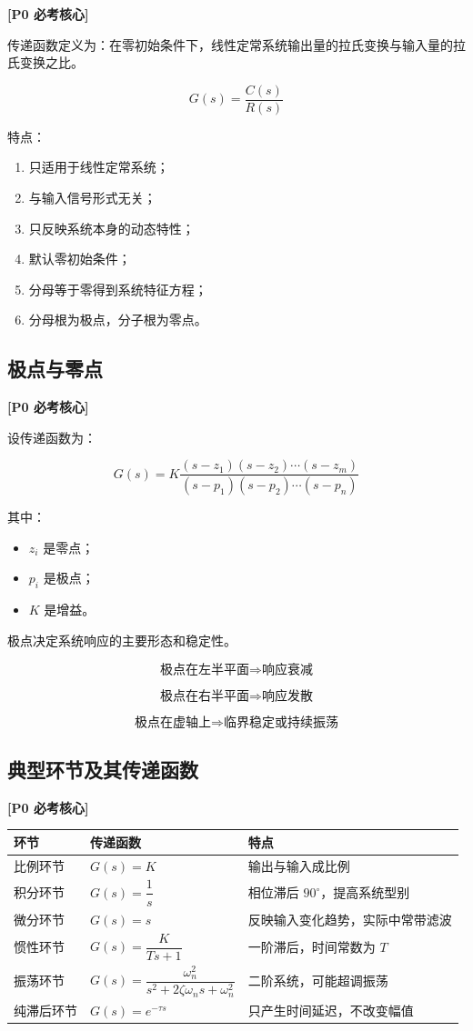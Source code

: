 \documentclass[UTF8,a4paper,12pt]{ctexart}
\newcommand{\Pzero}{\textcolor{p0}{\textbf{[P0 必考核心]}}}
\begin{document}
\Pzero

传递函数定义为：在零初始条件下，线性定常系统输出量的拉氏变换与输入量的拉氏变换之比。

\[
G(s)=\frac{C(s)}{R(s)}
\]

特点：

\begin{enumerate}
    \item 只适用于线性定常系统；
    \item 与输入信号形式无关；
    \item 只反映系统本身的动态特性；
    \item 默认零初始条件；
    \item 分母等于零得到系统特征方程；
    \item 分母根为极点，分子根为零点。
\end{enumerate}

\subsection{极点与零点}

\Pzero

设传递函数为：

\[
G(s)=K\frac{(s-z_1)(s-z_2)\cdots(s-z_m)}
{(s-p_1)(s-p_2)\cdots(s-p_n)}
\]

其中：
\begin{itemize}
    \item $z_i$ 是零点；
    \item $p_i$ 是极点；
    \item $K$ 是增益。
\end{itemize}

极点决定系统响应的主要形态和稳定性。

\[
\text{极点在左半平面} \Rightarrow \text{响应衰减}
\]

\[
\text{极点在右半平面} \Rightarrow \text{响应发散}
\]

\[
\text{极点在虚轴上} \Rightarrow \text{临界稳定或持续振荡}
\]

\subsection{典型环节及其传递函数}

\Pzero

\begin{longtable}{p{4cm}p{5cm}p{5cm}}
\toprule
环节 & 传递函数 & 特点 \\
\midrule
比例环节 & $G(s)=K$ & 输出与输入成比例 \\
积分环节 & $G(s)=\dfrac{1}{s}$ & 相位滞后 $90^\circ$，提高系统型别 \\
微分环节 & $G(s)=s$ & 反映输入变化趋势，实际中常带滤波 \\
惯性环节 & $G(s)=\dfrac{K}{Ts+1}$ & 一阶滞后，时间常数为 $T$ \\
振荡环节 & $G(s)=\dfrac{\omega_n^2}{s^2+2\zeta\omega_ns+\omega_n^2}$ & 二阶系统，可能超调振荡 \\
纯滞后环节 & $G(s)=e^{-\tau s}$ & 只产生时间延迟，不改变幅值 \\
\bottomrule
\end{longtable}
\end{document}
